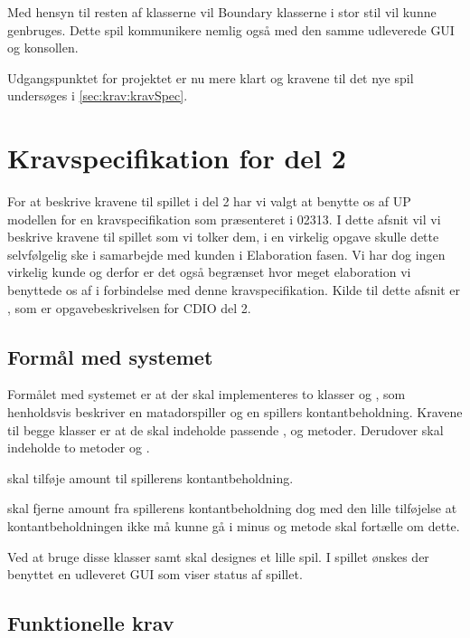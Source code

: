 Med hensyn til resten af klasserne vil Boundary klasserne i stor stil vil kunne genbruges. Dette spil kommunikere nemlig også med den samme udleverede GUI og konsollen.

Udgangspunktet for projektet er nu mere klart og kravene til det nye spil undersøges i \vref{sec:krav:kravSpec}.

\section{Kravspecifikation for del 2}\label{sec:krav:kravSpec}
For at beskrive kravene til spillet i del 2 har vi valgt at benytte os af UP modellen for en kravspecifikation som præsenteret i 02313. I dette afsnit vil vi beskrive kravene til spillet som vi tolker dem, i en virkelig opgave skulle dette selvfølgelig ske i samarbejde med kunden i Elaboration fasen. Vi har dog ingen virkelig kunde og derfor er det også begrænset hvor meget elaboration vi benyttede os af i forbindelse med denne kravspecifikation. Kilde til dette afsnit er \cite{CDIOdel2}, som er opgavebeskrivelsen for CDIO del 2.

\subsection{Formål med systemet}\label{sec:krav:kravSpec:formaal}
Formålet med systemet er at der skal implementeres to klasser  og , som henholdsvis beskriver en matadorspiller og en spillers kontantbeholdning. Kravene til begge klasser er at de skal indeholde passende ,  og  metoder. Derudover skal  indeholde to metoder  og .

 skal tilføje amount til spillerens kontantbeholdning.

 skal fjerne amount fra spillerens kontantbeholdning dog med den lille tilføjelse at kontantbeholdningen ikke må kunne gå i minus og metode skal fortælle om dette.

Ved at bruge disse klasser samt  skal designes et lille spil. I spillet ønskes der benyttet en udleveret GUI som viser status af spillet.

\subsection{Funktionelle krav}\label{sec:krav:kravSpec:funkKrav}

